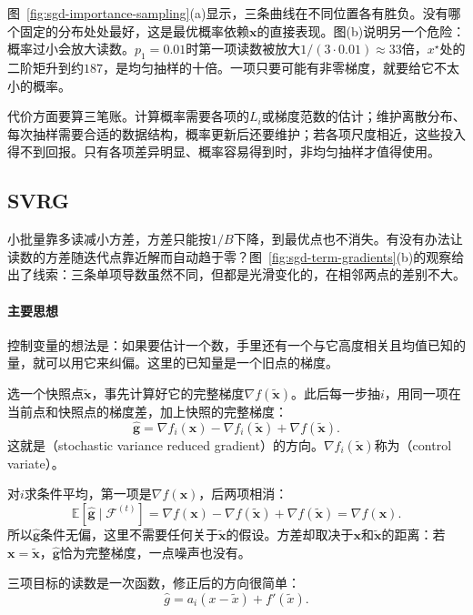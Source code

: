 图~\ref{fig:sgd-importance-sampling}(a)显示，三条曲线在不同位置各有胜负。没有哪个固定的分布处处最好，这是最优概率依赖$\bm{x}$的直接表现。图(b)说明另一个危险：概率过小会放大读数。$p_1=0.01$时第一项读数被放大$1/(3\cdot0.01)\approx33$倍，$x^\star$处的二阶矩升到约$187$，是均匀抽样的十倍。一项只要可能有非零梯度，就要给它不太小的概率。

代价方面要算三笔账。计算概率需要各项的$L_i$或梯度范数的估计；维护离散分布、每次抽样需要合适的数据结构，概率更新后还要维护；若各项尺度相近，这些投入得不到回报。只有各项差异明显、概率容易得到时，非均匀抽样才值得使用。

\subsection{SVRG}
\label{sec:sgd-svrg}

小批量靠多读减小方差，方差只能按$1/B$下降，到最优点也不消失。有没有办法让读数的方差随迭代点靠近解而自动趋于零？图~\ref{fig:sgd-term-gradients}(b)的观察给出了线索：三条单项导数虽然不同，但都是光滑变化的，在相邻两点的差别不大。

\paragraph{主要思想}
控制变量的想法是：如果要估计一个数，手里还有一个与它高度相关且均值已知的量，就可以用它来纠偏。这里的已知量是一个旧点的梯度。

选一个快照点$\tilde{\bm{x}}$，事先计算好它的完整梯度$\nabla f(\tilde{\bm{x}})$。此后每一步抽$i$，用同一项在当前点和快照点的梯度差，加上快照的完整梯度：
\begin{equation}
 \hat{\bm{g}}=\nabla f_i(\bm{x})-\nabla f_i(\tilde{\bm{x}})+\nabla f(\tilde{\bm{x}}).
 \label{eq:sgd-svrg-direction}
\end{equation}
这就是（stochastic variance reduced gradient）的方向。$\nabla f_i(\tilde{\bm{x}})$称为（control variate）。

对$i$求条件平均，第一项是$\nabla f(\bm{x})$，后两项相消：
\[
 \mathbb{E}[\hat{\bm{g}}\mid\mathcal{F}^{(t)}]=\nabla f(\bm{x})-\nabla f(\tilde{\bm{x}})+\nabla f(\tilde{\bm{x}})=\nabla f(\bm{x}).
\]
所以$\hat{\bm{g}}$条件无偏，这里不需要任何关于$\tilde{\bm{x}}$的假设。方差却取决于$\bm{x}$和$\tilde{\bm{x}}$的距离：若$\bm{x}=\tilde{\bm{x}}$，$\hat{\bm{g}}$恰为完整梯度，一点噪声也没有。

三项目标的读数是一次函数，修正后的方向很简单：
\[
 \hat{g}=a_i(x-\tilde{x})+f'(\tilde{x}).
\]

